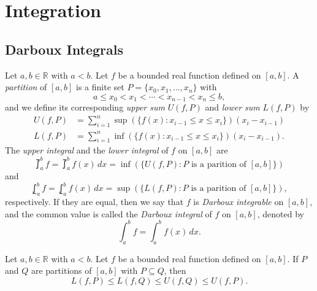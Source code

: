 \chapter{Integration}
\section{Darboux Integrals}
\begin{definition}
  Let $a, b \in \mathbb{R}$ with $a < b$.
  Let $f$ be a bounded real function defined on $[a, b]$.
  A \emph{partition} of $[a, b]$ is a finite set $P = \{x_0, x_1, \dots, x_n\}$
  with
  \begin{equation*}
    a \leq x_0 < x_1 < \cdots < x_{n-1} < x_n \leq b,
  \end{equation*}
  and we define its corresponding \emph{upper sum} $U(f, P)$ and
  \emph{lower sum} $L(f, P)$ by
  \begin{align*}
    U(f, P) &= \sum_{i=1}^n \sup(\{f(x): x_{i-1} \leq x \leq x_i\})
    (x_i - x_{i-1}) \\
    L(f, P) &= \sum_{i=1}^n \inf(\{f(x): x_{i-1} \leq x \leq x_i\})
    (x_i - x_{i-1}).
  \end{align*}
  The \emph{upper integral} and the \emph{lower integral} of $f$ on $[a, b]$
  are
  \begin{equation*}
    \upint_a^b f
    = \upint_a^b f(x) \, dx
    = \inf(\{U(f, P): \text{$P$ is a parition of $[a, b]$}\})
  \end{equation*}
  and
  \begin{equation*}
    \lowint_a^b f
    = \lowint_a^b f(x) \, dx
    = \sup(\{L(f, P): \text{$P$ is a parition of $[a, b]$}\}),
  \end{equation*}
  respectively.
  If they are equal, then we say that $f$ is \emph{Darboux integrable} on
  $[a, b]$, and the common value is called the \emph{Darboux integral} of $f$
  on $[a, b]$, denoted by
  \begin{equation*}
    \int_a^b f = \int_a^b f(x) \, dx.
  \end{equation*}
\end{definition}

\begin{lemma}
  Let $a, b \in \mathbb{R}$ with $a < b$.
  Let $f$ be a bounded real function defined on $[a, b]$.
  If $P$ and $Q$ are partitions of $[a, b]$ with $P \subseteq Q$, then
  \begin{equation*}
    L(f, P) \leq L(f, Q) \leq U(f, Q) \leq U(f, P).
  \end{equation*}
\end{lemma}

